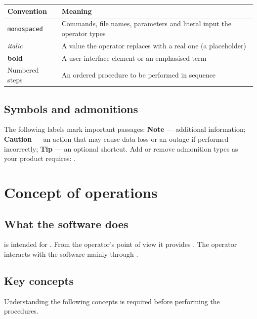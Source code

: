 \documentclass[12pt,a4paper]{extarticle}
\begin{document}
\begin{center}
\small
\begin{tabularx}{\textwidth}{|>{\raggedright\arraybackslash}p{}|X|}
\hline
\textbf{Convention} & \textbf{Meaning} \\
\hline
\texttt{monospaced} & Commands, file names, parameters and literal input the operator types \\
\hline
\textit{italic} & A value the operator replaces with a real one (a placeholder) \\
\hline
\textbf{bold} & A user-interface element or an emphasised term \\
\hline
Numbered steps & An ordered procedure to be performed in sequence \\
\hline
\end{tabularx}
\end{center}

\subsection{Symbols and admonitions}
The following labels mark important passages: \textbf{Note} — additional information; \textbf{Caution} — an action that may cause data loss or an outage if performed incorrectly; \textbf{Tip} — an optional shortcut. Add or remove admonition types as your product requires: .

\section{Concept of operations}\label{sec:concept}

\subsection{What the software does}
\hseProjectNameEn{} is intended for . From the operator's point of view it provides . The operator interacts with the software mainly through .

\subsection{Key concepts}
Understanding the following concepts is required before performing the procedures.
\end{document}
